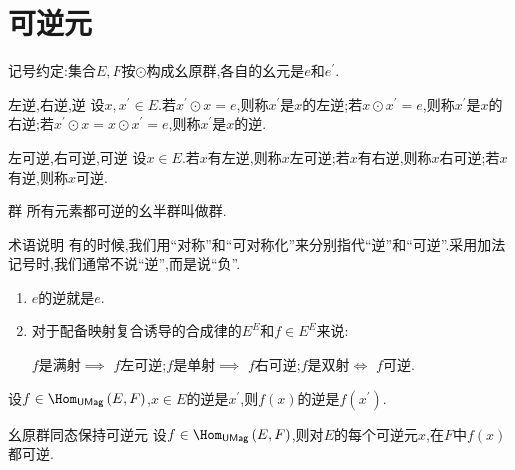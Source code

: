 \section{可逆元}

记号约定:集合$E,F$按$\odot$构成幺原群,各自的幺元是$e$和$e^{\prime}$.

\begin{definition}{左逆,右逆,逆}{}
	设$x,x^{\prime}\in E$.若$x^{\prime}\odot x=e$,则称$x^{\prime}$是$x$的左逆;若$x\odot x^{\prime}=e$,则称$x^{\prime}$是$x$的右逆;若$x^{\prime}\odot x=x\odot x^{\prime}=e$,则称$x^{\prime}$是$x$的逆.
\end{definition}

\begin{definition}{左可逆,右可逆,可逆}{}
	设$x\in E$.若$x$有左逆,则称$x$左可逆;若$x$有右逆,则称$x$右可逆;若$x$有逆,则称$x$可逆.
\end{definition}

\begin{definition}{群}{}
	所有元素都可逆的幺半群叫做群.
\end{definition}

\begin{remark}{术语说明}{}
	有的时候,我们用``对称''和``可对称化''来分别指代``逆''和``可逆''.采用加法记号时,我们通常不说``逆'',而是说``负''.
\end{remark}

\begin{example}{}{}
	\begin{enumerate}
		\item $e$的逆就是$e$.
		\item 对于配备映射复合诱导的合成律的$E^{E}$和$f\in E^{E}$来说:
		\begin{center}
			$f$是满射$\implies$ $f$左可逆;$f$是单射$\implies$ $f$右可逆;$f$是双射$\iff$ $f$可逆.
		\end{center}
	\end{enumerate}
\end{example}

\begin{proposition}{}{}
	设$f\in\Hom_{\mathsf{UMag}}\left(E,F\right)$,$x\in E$的逆是$x^{\prime}$,则$f\left(x\right)$的逆是$f\left(x^{\prime}\right)$.
\end{proposition}

\begin{corollary}{幺原群同态保持可逆元}{}
	设$f\in\Hom_{\mathsf{UMag}}\left(E,F\right)$,则对$E$的每个可逆元$x$,在$F$中$f\left(x\right)$都可逆.
\end{corollary}

